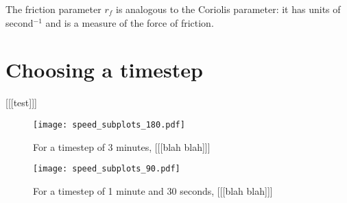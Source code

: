 The friction parameter $r_f$ is analogous to the Coriolis parameter: it has units of second$^{-1}$ and is a measure of the force of friction.

\section{Choosing a timestep} \label{sec:timestep}
[[[test]]]

\begin{figure}
    \texttt{[image: speed\_subplots\_180.pdf]}
    \centering
    \caption{For a timestep of 3 minutes, [[[blah blah]]]}
    \label{}
\end{figure}

\begin{figure}
    \texttt{[image: speed\_subplots\_90.pdf]}
    \centering
    \caption{For a timestep of 1 minute and 30 seconds, [[[blah blah]]]}
    \label{}
\end{figure}
